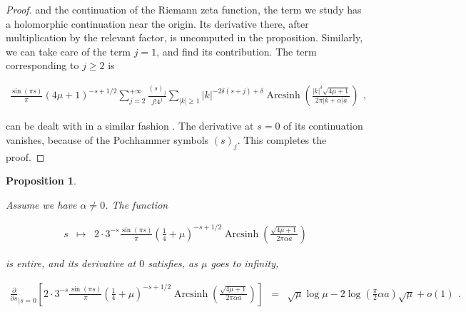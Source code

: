 \documentclass{jams-l}
\newtheorem{proposition}[theorem]{Proposition}
\theoremstyle{definition}
\theoremstyle{remark}
\numberwithin{equation}{section}
\DeclareMathOperator{\arcsinh}{Arcsinh}
\begin{document}
\begin{proof}
                \noindent and the continuation of the Riemann zeta function, the term we study has a holomorphic continuation near the origin. Its derivative there, after multiplication by the relevant factor, is uncomputed in the proposition. Similarly, we can take care of the term $j=1$, and find its contribution. The term corresponding to $j \geqslant 2$ is
                
                \[ \begin{array}{l}
                        \frac{\sin \left(\pi s \right)}{\pi} \left( 4 \mu + 1 \right)^{-s+1/2} \sum\limits_{j = 2}^{+ \infty} \frac{\left( s \right)_j}{j! 4^{j}} \sum\limits_{\left \vert k \right \vert \geqslant 1}  \left \vert k \right \vert^{-2 \delta \left( s + j \right) + \delta} \arcsinh \left( \frac{\left \vert k \right \vert^{\delta} \sqrt{4 \mu + 1}}{2 \pi \left \vert k + \alpha \right \vert a} \right)
                    \end{array} , \]
                
                \noindent can be dealt with in a similar fashion . The derivative at $s=0$ of its continuation vanishes, because of the Pochhammer symbols $\left( s \right)_j$. This completes the proof.
            
            \end{proof}
            
            \begin{proposition}
            \label{PropA4-0}
            
                Assume we have $\alpha \neq 0$. The function
                
                \[ \begin{array}{lll}
                        s & \longmapsto & 2 \cdot 3^{-s} \frac{\sin \left( \pi s \right)}{\pi} \left( \frac{1}{4} + \mu \right)^{-s+1/2} \arcsinh \left( \frac{\sqrt{4 \mu + 1}}{2 \pi \alpha a} \right)
                    \end{array} \]
                
                \noindent is entire, and its derivative at $0$ satisfies, as $\mu$ goes to infinity,
                
                \[ \begin{array}{lll}
                        \scriptstyle \frac{\partial}{\partial s}_{\left \vert s = 0 \right.} \left[ 2 \cdot 3^{-s} \frac{\sin \left( \pi s \right)}{\pi} \left( \frac{1}{4} + \mu \right)^{-s+1/2} \arcsinh \left( \frac{\sqrt{4 \mu + 1}}{2 \pi \alpha a} \right) \right] & \scriptstyle = & \scriptstyle \sqrt{\mu} \log \mu - 2 \log \left( \frac{\pi}{2} \alpha a \right) \sqrt{\mu} + o \left( 1 \right)
                    \end{array} . \]
            
            \end{proposition}
            
\end{document}
